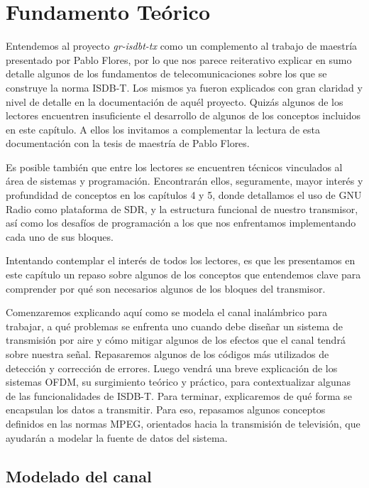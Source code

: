 \chapter{Fundamento Teórico}

Entendemos al proyecto \textit{gr-isdbt-tx} como un complemento al trabajo de maestría presentado por Pablo Flores, por lo que nos parece reiterativo explicar en sumo detalle algunos de los fundamentos de telecomunicaciones sobre los que se construye la norma ISDB-T. Los mismos ya fueron explicados con gran claridad y nivel de detalle en la documentación de aquél proyecto. Quizás algunos de los lectores encuentren insuficiente el desarrollo de algunos de los conceptos incluidos en este capítulo. A ellos los invitamos a complementar la lectura de esta documentación con la tesis de maestría de Pablo Flores.

Es posible también que entre los lectores se encuentren técnicos vinculados al área de sistemas y programación.  Encontrarán ellos, seguramente, mayor interés y profundidad de conceptos en los capítulos 4 y 5, donde detallamos el uso de GNU Radio como plataforma de SDR, y la estructura funcional de nuestro transmisor, así como los desafíos de programación a los que nos enfrentamos implementando cada uno de sus bloques. 

Intentando contemplar el interés de todos los lectores, es que les presentamos en este capítulo un repaso sobre algunos de los conceptos que entendemos clave para comprender por qué son necesarios algunos de los bloques del transmisor. 

Comenzaremos explicando aquí como se modela el canal inalámbrico para trabajar, a qué problemas se enfrenta uno cuando debe diseñar un sistema de transmisión por aire y cómo mitigar algunos de los efectos que el canal tendrá sobre nuestra señal. Repasaremos algunos de los códigos más utilizados de detección y corrección de errores. Luego vendrá una breve explicación de los sistemas \gls{OFDM}, su surgimiento teórico y práctico, para contextualizar algunas de las funcionalidades de ISDB-T. Para terminar, explicaremos de qué forma se encapsulan los datos a transmitir. Para eso, repasamos algunos conceptos definidos en las normas \gls{MPEG}, orientados hacia la transmisión de televisión, que ayudarán a modelar la fuente de datos del sistema.  

\section{Modelado del canal}

